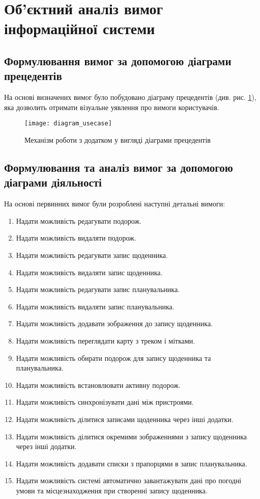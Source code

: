 \documentclass[../main.tex]{subfiles}
\begin{document}
\section{Об'єктний аналіз вимог інформаційної системи}

\subsection{Формулювання вимог за допомогою діаграми прецедентів}
На основі визначених вимог було побудовано діаграму прецедентів (див. рис. \ref{diagram:1}), яка дозволить отримати візуальне уявлення про вимоги користувачів.

\begin{figure}[H]
	\centering
	\texttt{[image: diagram\_usecase]}
	\caption{Механізм роботи з додатком у вигляді діаграми прецедентів}
	\label{diagram:1}
\end{figure}

\subsection{Формулювання та аналіз вимог за допомогою діаграми діяльності}

На основі первинних вимог були розроблені наступні детальні вимоги:
\begin{enumerate}
	\item Надати можливість редагувати подорож.
	\item Надати можливість видаляти подорож.
	\item Надати можливість редагувати запис щоденника.
	\item Надати можливість видаляти запис щоденника.
	\item Надати можливість редагувати запис планувальника.
	\item Надати можливість видаляти запис планувальника.
	\item Надати можливість додавати зображення до запису щоденника.
	\item Надати можливість переглядати карту з треком і мітками.
	\item Надати можливість обирати подорож для запису щоденника та планувальника.
	\item Надати можливість встановлювати активну подорож.
	\item Надати можливість синхронізувати дані між пристроями.
	\item Надати можливість ділитися записами щоденника через інші додатки.
	\item Надати можливість ділитися окремими зображеннями з запису щоденника через інші додатки.
	\item Надати можливість додавати списки з прапорцями в запис планувальника.
	\item Надати можливість системі автоматично завантажувати дані про погодні умови та місцезнаходження при створенні запису щоденника.
\end{enumerate}
\end{document}
